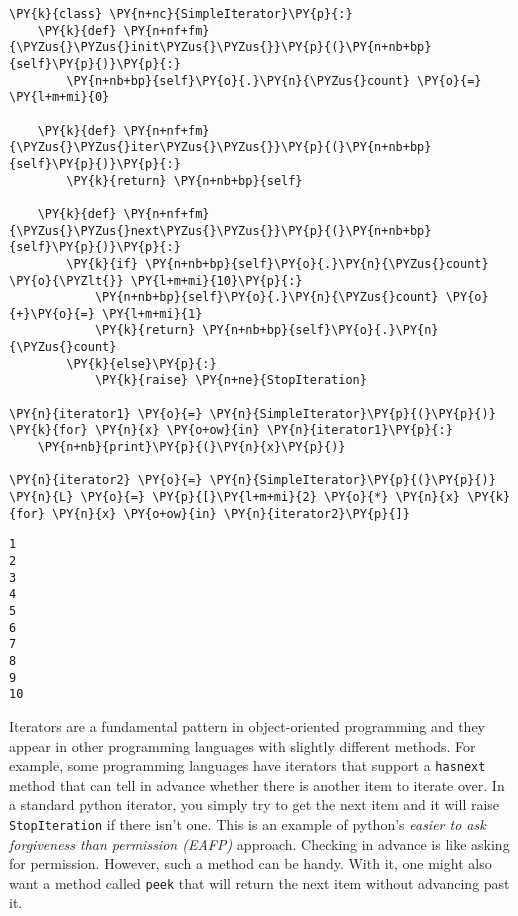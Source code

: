 \begin{Verbatim}[commandchars=\\\{\}]
\PY{k}{class} \PY{n+nc}{SimpleIterator}\PY{p}{:}
    \PY{k}{def} \PY{n+nf+fm}{\PYZus{}\PYZus{}init\PYZus{}\PYZus{}}\PY{p}{(}\PY{n+nb+bp}{self}\PY{p}{)}\PY{p}{:}
        \PY{n+nb+bp}{self}\PY{o}{.}\PY{n}{\PYZus{}count} \PY{o}{=} \PY{l+m+mi}{0}

    \PY{k}{def} \PY{n+nf+fm}{\PYZus{}\PYZus{}iter\PYZus{}\PYZus{}}\PY{p}{(}\PY{n+nb+bp}{self}\PY{p}{)}\PY{p}{:}
        \PY{k}{return} \PY{n+nb+bp}{self}

    \PY{k}{def} \PY{n+nf+fm}{\PYZus{}\PYZus{}next\PYZus{}\PYZus{}}\PY{p}{(}\PY{n+nb+bp}{self}\PY{p}{)}\PY{p}{:}
        \PY{k}{if} \PY{n+nb+bp}{self}\PY{o}{.}\PY{n}{\PYZus{}count} \PY{o}{\PYZlt{}} \PY{l+m+mi}{10}\PY{p}{:}
            \PY{n+nb+bp}{self}\PY{o}{.}\PY{n}{\PYZus{}count} \PY{o}{+}\PY{o}{=} \PY{l+m+mi}{1}
            \PY{k}{return} \PY{n+nb+bp}{self}\PY{o}{.}\PY{n}{\PYZus{}count}
        \PY{k}{else}\PY{p}{:}
            \PY{k}{raise} \PY{n+ne}{StopIteration}

\PY{n}{iterator1} \PY{o}{=} \PY{n}{SimpleIterator}\PY{p}{(}\PY{p}{)}
\PY{k}{for} \PY{n}{x} \PY{o+ow}{in} \PY{n}{iterator1}\PY{p}{:}
    \PY{n+nb}{print}\PY{p}{(}\PY{n}{x}\PY{p}{)}

\PY{n}{iterator2} \PY{o}{=} \PY{n}{SimpleIterator}\PY{p}{(}\PY{p}{)}
\PY{n}{L} \PY{o}{=} \PY{p}{[}\PY{l+m+mi}{2} \PY{o}{*} \PY{n}{x} \PY{k}{for} \PY{n}{x} \PY{o+ow}{in} \PY{n}{iterator2}\PY{p}{]}
\end{Verbatim}

\begin{Verbatim}
1
2
3
4
5
6
7
8
9
10

\end{Verbatim}


Iterators are a fundamental pattern in object-oriented programming and they appear in other programming languages with slightly different methods.
For example, some programming languages have iterators that support a \texttt{hasnext} method that can tell in advance whether there is another item to iterate over.
In a standard python iterator, you simply try to get the next item and it will raise \texttt{StopIteration} if there isn't one.
This is an example of python's \emph{easier to ask forgiveness than permission (EAFP)} approach.
Checking in advance is like asking for permission.
However, such a method can be handy.
With it, one might also want a method called \texttt{peek} that will return the next item without advancing past it.


